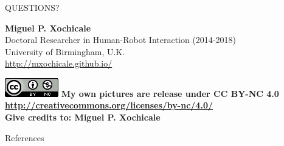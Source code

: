 \documentclass{beamer}
\begin{document}
\begin{frame}
\frametitle{}

\vspace{2cm}
\begin{center}
\LARGE{QUESTIONS?}
\end{center}

\vspace{1cm}

\normalsize
\textbf{Miguel P. Xochicale} \\
Doctoral Researcher in Human-Robot Interaction (2014-2018)\\
University of Birmingham, U.K. \\
{\color{blue} \href{http://mxochicale.github.io/}{http://mxochicale.github.io/ } } \\


\vspace{1cm}


\includegraphics[scale=.4]{CC4}
\tiny{
\textbf{My own pictures are release under CC BY-NC 4.0
{\color{blue} \href{http://creativecommons.org/licenses/by-nc/4.0/}{http://creativecommons.org/licenses/by-nc/4.0/} } \\
Give credits to: Miguel P. Xochicale
}
}

\end{frame}







 \begin{frame}{References}
  \nocite{*}

  
  


%  
\end{frame}






%
\end{document}
